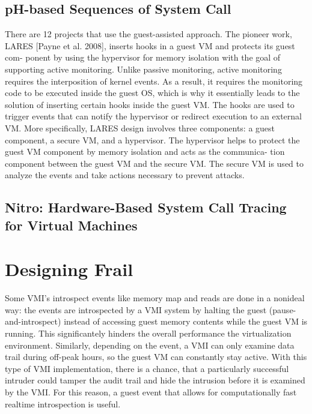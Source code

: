 \documentclass{report}
\begin{document}
\begin{spacing}{1.5}
\section{pH-based Sequences of System Call}



{\large


There are 12 projects that use the guest-assisted approach. The pioneer
work, LARES [Payne et al. 2008], inserts hooks in a guest VM and protects its guest com-
ponent by using the hypervisor for memory isolation with the goal of supporting active
monitoring. Unlike passive monitoring, active monitoring requires the interposition of kernel events. As a result, it requires the monitoring code to be executed inside the guest OS, which is why it essentially leads to the solution of inserting certain hooks inside the guest VM. The hooks are used to trigger events that can notify the hypervisor
or redirect execution to an external VM. More specifically, LARES design involves three
components: a guest component, a secure VM, and a hypervisor. The hypervisor helps
to protect the guest VM component by memory isolation and acts as the communica-
tion component between the guest VM and the secure VM. The secure VM is used to
analyze the events and take actions necessary to prevent attacks.


}

\section{Nitro: Hardware-Based System Call Tracing for Virtual Machines}

\chapter{Designing Frail}

Some VMI's introspect events like memory map and reads are done in a nonideal way: the events are introspected by a VMI system by halting the guest (pause-and-introspect) instead of accessing guest memory contents while the guest VM is running. This significantely hinders the overall performance the virtualization environment. Similarly, depending on the event, a VMI can only examine data trail during off-peak hours, so the guest VM can constantly stay active. With this type of VMI implementation, there is a chance, that a particularly successful intruder could tamper the audit trail and hide the intrusion before it is examined by the VMI. For this reason, a guest event that allows for computationally fast realtime introspection is useful.




\end{spacing}
\end{document}
